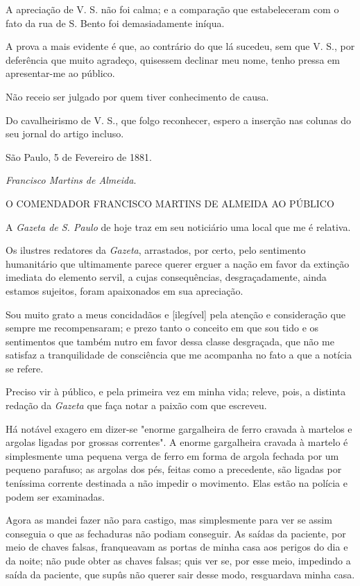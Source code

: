 A apreciação de V. S. não foi calma; e a comparação que estabeleceram
com o fato da rua de S. Bento foi demasiadamente iníqua.

A prova a mais evidente é que, ao contrário do que lá sucedeu, sem que
V. S., por deferência que muito agradeço, quisessem declinar meu nome,
tenho pressa em apresentar-me ao público.

Não receio ser julgado por quem tiver conhecimento de causa.

Do cavalheirismo de V. S., que folgo reconhecer, espero a inserção nas
colunas do seu jornal do artigo incluso.

São Paulo, 5 de Fevereiro de 1881.

\emph{Francisco Martins de Almeida}.

O COMENDADOR FRANCISCO MARTINS DE ALMEIDA AO PÚBLICO

A \emph{Gazeta de S. Paulo} de hoje traz em seu noticiário uma local que
me é relativa.

Os ilustres redatores da \emph{Gazeta}, arrastados, por certo, pelo
sentimento humanitário que ultimamente parece querer erguer a nação em
favor da extinção imediata do elemento servil, a cujas consequências,
desgraçadamente, ainda estamos sujeitos, foram apaixonados em sua
apreciação.

Sou muito grato a meus concidadãos e {[}ilegível{]} pela atenção e
consideração que sempre me recompensaram; e prezo tanto o conceito em
que sou tido e os sentimentos que também nutro em favor dessa classe
desgraçada, que não me satisfaz a tranquilidade de consciência que me
acompanha no fato a que a notícia se refere.

Preciso vir à público, e pela primeira vez em minha vida; releve, pois,
a distinta redação da \emph{Gazeta} que faça notar a paixão com que
escreveu.

Há notável exagero em dizer-se "enorme gargalheira de ferro cravada à
martelos e argolas ligadas por grossas correntes". A enorme gargalheira
cravada à martelo é simplesmente uma pequena verga de ferro em forma de
argola fechada por um pequeno parafuso; as argolas dos pés, feitas como
a precedente, são ligadas por teníssima corrente destinada a não impedir
o movimento. Elas estão na polícia e podem ser examinadas.

Agora as mandei fazer não para castigo, mas simplesmente para ver se
assim conseguia o que as fechaduras não podiam conseguir. As saídas da
paciente, por meio de chaves falsas, franqueavam as portas de minha casa
aos perigos do dia e da noite; não pude obter as chaves falsas; quis ver
se, por esse meio, impedindo a saída da paciente, que supûs não querer
sair desse modo, resguardava minha casa.

